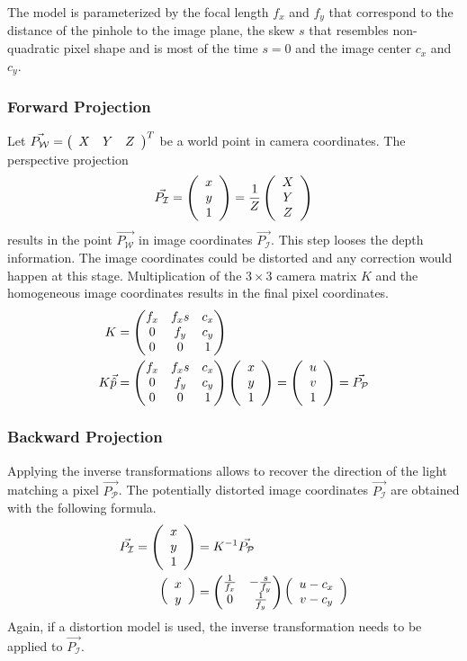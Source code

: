 The model is parameterized by the focal length $f_x$ and $f_y$ that correspond to the distance of the pinhole to the image plane, the skew $s$ that resembles non-quadratic pixel shape and is most of the time $s = 0$ and the image center $c_x$ and $c_y$.

\subsubsection*{Forward Projection}

Let $\vec{P_\mathcal{W}} = \left(\begin{array}{ccc} X & Y & Z \end{array}\right)^T$ be a world point in camera coordinates.
The perspective projection
\begin{equation}
    \vec{P_\mathcal{I}} = \left(\begin{array}{c} x \\ y \\ 1 \end{array}\right) = \frac{1}{Z}\left(\begin{array}{c} X \\ Y \\ Z \end{array}\right)
    \label{eq:pinhole_forward}
\end{equation}
results in the point $\vec{P_\mathcal{W}}$ in image coordinates $\vec{P_\mathcal{I}}$. This step looses the depth information.
The image coordinates could be distorted and any correction would happen at this stage.
Multiplication of the $3 \times 3$ camera matrix $K$ and the homogeneous image coordinates results in the final pixel coordinates.
\begin{equation}
\begin{aligned}
K &= \begin{pmatrix}
        f_x & f_x s & c_x \\
        0   & f_y   & c_y \\
        0   & 0     & 1
     \end{pmatrix} \\
K \vec{\hat{p}} &= \begin{pmatrix}
        f_x & f_x s & c_x \\
        0   & f_y   & c_y \\
        0   & 0     & 1
    \end{pmatrix}\left(\begin{array}{c} x \\ y \\ 1 \end{array}\right) = \left(\begin{array}{c} u \\ v \\ 1 \end{array}\right) = \vec{P_\mathcal{P}}
\end{aligned}
\end{equation}

\subsubsection*{Backward Projection}

Applying the inverse transformations allows to recover the direction of the light matching a pixel $\vec{P_\mathcal{P}}$.
The potentially distorted image coordinates $\vec{P_\mathcal{I}}$ are obtained with the following formula.
\begin{equation}
\begin{aligned}
    \vec{P_\mathcal{I}} = \left(\begin{array}{c} x \\ y \\ 1 \end{array}\right) &= K^{-1} \vec{P_\mathcal{P}} \\
    \left(\begin{array}{c} x \\ y \end{array}\right) &= \begin{pmatrix}\frac{1}{f_x} & -\frac{s}{f_y} \\ 0 & \frac{1}{f_y}\end{pmatrix} \left(\begin{array}{c} u - c_x \\ v - c_y \end{array}\right)
\end{aligned}
\end{equation}
Again, if a distortion model is used, the inverse transformation needs to be applied to $\vec{P_\mathcal{I}}$.


